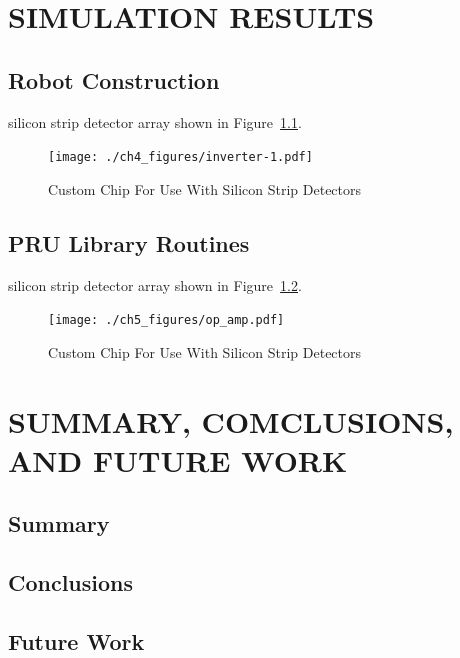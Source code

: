 \documentclass[12pt,oneside,final]{siuethesis}
\theoremstyle{definition}
\begin{document}
\chapter{SIMULATION RESULTS}

\section{Robot Construction}
silicon strip detector array shown in Figure~\ref{FIG:INV_TER}.
\begin{figure}[htbp!]
\centering
\texttt{[image: ./ch4\_figures/inverter-1.pdf]} 
\caption{Custom Chip For Use With 
Silicon Strip Detectors}
\label{FIG:INV_TER}
\end{figure}





\section{PRU Library Routines}

silicon strip detector array shown in Figure~\ref{FIG:OPAMP}.
\begin{figure}[htbp!]
\centering
\texttt{[image: ./ch5\_figures/op\_amp.pdf]} 
\caption{Custom Chip For Use With 
Silicon Strip Detectors}
\label{FIG:OPAMP}
\end{figure}


\chapter{SUMMARY, COMCLUSIONS, AND FUTURE WORK}

\section{Summary}


\section{Conclusions}

\section{Future Work}



\end{document}

